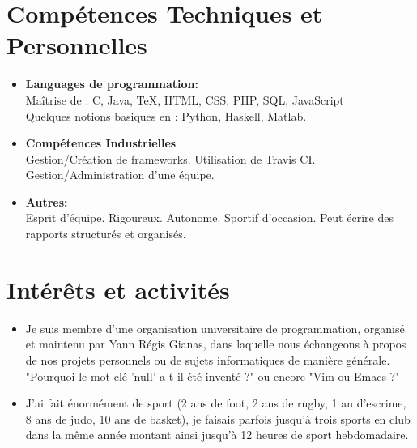 \documentclass[11pt,a4paper,sans]{moderncv}        %
\begin{document}
\newpage

\section{Compétences Techniques et Personnelles}

\vspace{6pt}

\begin{itemize}

\item \textbf{Languages de programmation:} \\ Maîtrise de : C, Java, TeX, HTML, CSS, PHP, SQL, JavaScript \\ Quelques notions basiques en : Python, Haskell, Matlab.

\vspace{6pt}

\item \textbf{Compétences Industrielles} \\ Gestion/Création de frameworks. Utilisation de Travis CI. Gestion/Administration d'une équipe.

\vspace{6pt}

\item \textbf{Autres:} \\ Esprit d'équipe. Rigoureux. Autonome. Sportif d'occasion. Peut écrire des rapports structurés et organisés.

\end{itemize}

\section{Intérêts et activités}

\vspace{6pt}

\begin{itemize}

\item{Je suis membre d'une organisation universitaire de programmation, organisé et maintenu par Yann Régis Gianas, dans laquelle nous échangeons à propos de nos projets personnels ou de sujets informatiques de manière générale. "Pourquoi le mot clé 'null' a-t-il été inventé ?" ou encore "Vim ou Emacs ?"}

\vspace{6pt}

\item{J'ai fait énormément de sport (2 ans de foot, 2 ans de rugby, 1 an d'escrime, 8 ans de judo, 10 ans de basket), je faisais parfois jusqu'à trois sports en club dans la même année montant ainsi jusqu'à 12 heures de sport hebdomadaire.}

\end{itemize}
\end{document}
